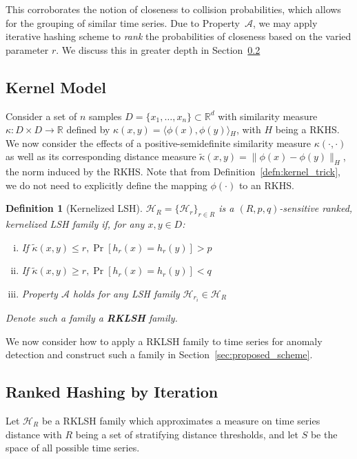 \documentclass[a4paper]{article}
\newcommand{\innerproduct}[2]{\langle{}#1,#2\rangle{}}
\theoremstyle{def}
\newtheorem{definition}{Definition}
\theoremstyle{thm}
\newcommand{\R}[0]{\mathbb{R}}
\newcommand{\LSH}[0]{\mathcal{H}}
\begin{document}
This corroborates the notion of closeness to collision probabilities, which allows for the grouping of similar time series.
Due to Property~$\mathscr{A}$, we may apply iterative hashing scheme to \textit{rank} the probabilities of closeness based on the varied parameter $r$.
We discuss this in greater depth in Section~\ref{subsec:ranked_lsh}

\subsection{Kernel Model}
\label{subsec:kernel_model}

Consider a set of $n$ samples $D = \{x_1,\ldots,x_n\} \subset \R^d$ with similarity measure $\kappa \colon D \times D \rightarrow \R$ defined by $\kappa(x,y) = \innerproduct{\phi(x)}{\phi(y)}_H$, with $H$ being a RKHS.
We now consider the effects of a positive-semidefinite similarity measure $\kappa(\cdot, \cdot)$ as well as its corresponding distance measure $\tilde{\kappa}(x,y) = \|\phi(x) - \phi(y)\|_H$, the norm induced by the RKHS.
Note that from Definition~\ref{defn:kernel_trick}, we do not need to explicitly define the mapping $\phi(\cdot)$ to an RKHS.

\begin{definition}[Kernelized LSH]\label{defn:kernel_lsh}
    ${\LSH}_R = \{ {\LSH}_r \}_{r \in R}$ is a $(R, p, q)$-sensitive ranked, kernelized LSH family if, for any $x,y \in D$:
    \begin{enumerate}[(i)]
        \item If $\tilde{\kappa}(x,y) \le r, \Pr[h_r(x) = h_r(y)] > p$
        \item If $\tilde{\kappa}(x,y) \ge r, \Pr[h_r(x) = h_r(y)] < q$
        \item Property $\mathscr{A}$ holds for any LSH family ${\LSH}_{r_i} \in {\LSH}_R$
    \end{enumerate}
    Denote such a family a \textbf{RKLSH} family.
\end{definition}

We now consider how to apply a RKLSH family to time series for anomaly detection and construct such a family in Section~\ref{sec:proposed_scheme}.

\subsection{Ranked Hashing by Iteration}
\label{subsec:ranked_lsh}

Let ${\LSH}_R$ be a RKLSH family which approximates a measure on time series distance with $R$ being a set of stratifying distance thresholds, and let $S$ be the space of all possible time series.
\end{document}

